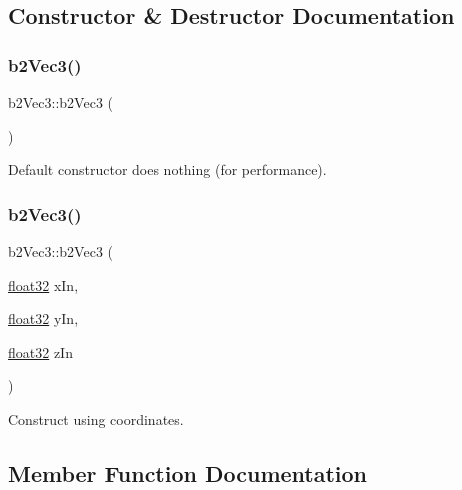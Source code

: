 \subsection{Constructor \& Destructor Documentation}
\mbox{\label{structb2_vec3_a837423f66d6fb72d815e7390c09938b9}} 
\subsubsection{\texorpdfstring{b2Vec3()}{b2Vec3()}\hspace{0.1cm}{\footnotesize\ttfamily [1/2]}}
{\footnotesize\ttfamily b2\+Vec3\+::b2\+Vec3 (\begin{DoxyParamCaption}{ }\end{DoxyParamCaption})\hspace{0.3cm}{\ttfamily [inline]}}



Default constructor does nothing (for performance). 

\mbox{\label{structb2_vec3_a5db4043a3ea58894562081f1f68195d9}} 
\subsubsection{\texorpdfstring{b2Vec3()}{b2Vec3()}\hspace{0.1cm}{\footnotesize\ttfamily [2/2]}}
{\footnotesize\ttfamily b2\+Vec3\+::b2\+Vec3 (\begin{DoxyParamCaption}\item[{\mbox{\hyperlink{b2_settings_8h_aacdc525d6f7bddb3ae95d5c311bd06a1}{float32}}}]{x\+In,  }\item[{\mbox{\hyperlink{b2_settings_8h_aacdc525d6f7bddb3ae95d5c311bd06a1}{float32}}}]{y\+In,  }\item[{\mbox{\hyperlink{b2_settings_8h_aacdc525d6f7bddb3ae95d5c311bd06a1}{float32}}}]{z\+In }\end{DoxyParamCaption})\hspace{0.3cm}{\ttfamily [inline]}}



Construct using coordinates. 



\subsection{Member Function Documentation}
\mbox{\label{structb2_vec3_a504ee372ea33e84027b088cdbe4b2f72}} 
